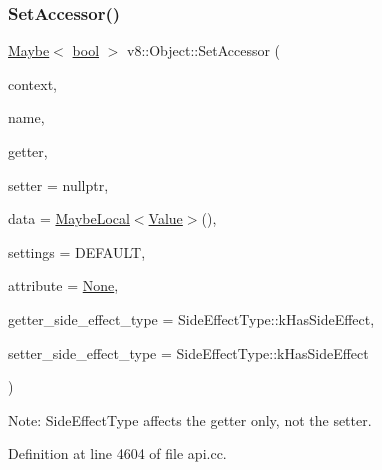\subsubsection{\texorpdfstring{Set\+Accessor()}{SetAccessor()}}
{\footnotesize\ttfamily \mbox{\hyperlink{classv8_1_1Maybe}{Maybe}}$<$ \mbox{\hyperlink{classbool}{bool}} $>$ v8\+::\+Object\+::\+Set\+Accessor (\begin{DoxyParamCaption}\item[{\mbox{\hyperlink{classv8_1_1Local}{Local}}$<$ Context $>$}]{context,  }\item[{\mbox{\hyperlink{classv8_1_1Local}{Local}}$<$ \mbox{\hyperlink{classv8_1_1Name}{Name}} $>$}]{name,  }\item[{Accessor\+Name\+Getter\+Callback}]{getter,  }\item[{Accessor\+Name\+Setter\+Callback}]{setter = {\ttfamily nullptr},  }\item[{\mbox{\hyperlink{classv8_1_1MaybeLocal}{Maybe\+Local}}$<$ \mbox{\hyperlink{classv8_1_1Value}{Value}} $>$}]{data = {\ttfamily \mbox{\hyperlink{classv8_1_1MaybeLocal}{Maybe\+Local}}$<$\mbox{\hyperlink{classv8_1_1Value}{Value}}$>$()},  }\item[{\mbox{\hyperlink{namespacev8_a31d8355cb043d7d2dda3f4a52760b64e}{Access\+Control}}}]{settings = {\ttfamily DEFAULT},  }\item[{\mbox{\hyperlink{namespacev8_a05f25f935e108a1ea2d150e274602b87}{Property\+Attribute}}}]{attribute = {\ttfamily \mbox{\hyperlink{namespacev8_a05f25f935e108a1ea2d150e274602b87a7ab4d58719c33b3ea2dfaefa29b111df}{None}}},  }\item[{\mbox{\hyperlink{namespacev8_a29711319c2b9fc7716d65faee2f7b9cb}{Side\+Effect\+Type}}}]{getter\+\_\+side\+\_\+effect\+\_\+type = {\ttfamily SideEffectType\+:\+:kHasSideEffect},  }\item[{\mbox{\hyperlink{namespacev8_a29711319c2b9fc7716d65faee2f7b9cb}{Side\+Effect\+Type}}}]{setter\+\_\+side\+\_\+effect\+\_\+type = {\ttfamily SideEffectType\+:\+:kHasSideEffect} }\end{DoxyParamCaption})}

Note\+: Side\+Effect\+Type affects the getter only, not the setter. 

Definition at line 4604 of file api.\+cc.

\mbox{\label{classv8_1_1Object_a0ccba69581f0b5e4e672bab90f26879b}} 
